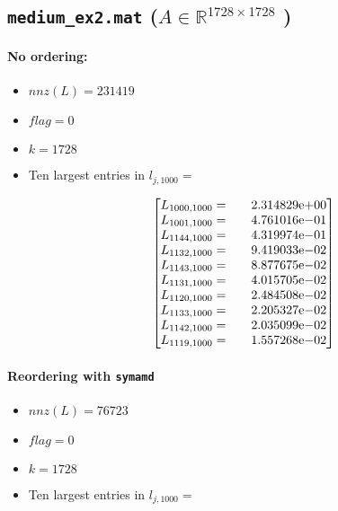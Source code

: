\begin{enumerate}
\subsection*{\texttt{medium\_ex2.mat} ($A\in \mathbb{R}^{1728\times 1728}$ )}
\paragraph*{No ordering:}
\begin{itemize}
\item $nnz(L)= 231419$
\item $flag= 0$
\item $k= 1728$
\item Ten largest entries in $l_{j,1000}= $

$$
\begin{bmatrix}
L_{1000,1000}=  & \quad {2.314829}\mathrm{e}{+00}\\
L_{1001,1000}=  & \quad {4.761016}\mathrm{e}{-01}\\
L_{1144,1000}=  & \quad {4.319974}\mathrm{e}{-01}\\
L_{1132,1000}=  & \quad {9.419033}\mathrm{e}{-02}\\
L_{1143,1000}=  & \quad {8.877675}\mathrm{e}{-02}\\
L_{1131,1000}=  & \quad {4.015705}\mathrm{e}{-02}\\
L_{1120,1000}=  & \quad {2.484508}\mathrm{e}{-02}\\
L_{1133,1000}=  & \quad {2.205327}\mathrm{e}{-02}\\
L_{1142,1000}=  & \quad {2.035099}\mathrm{e}{-02}\\
L_{1119,1000}=  & \quad {1.557268}\mathrm{e}{-02}\\
\end{bmatrix}
$$
\end{itemize}
\paragraph*{Reordering with \texttt{symamd}}
\begin{itemize}
\item $nnz(L)= 76723$
\item $flag= 0$
\item $k= 1728$
\item Ten largest entries in $l_{j,1000}= $


\end{itemize}
\end{enumerate}

